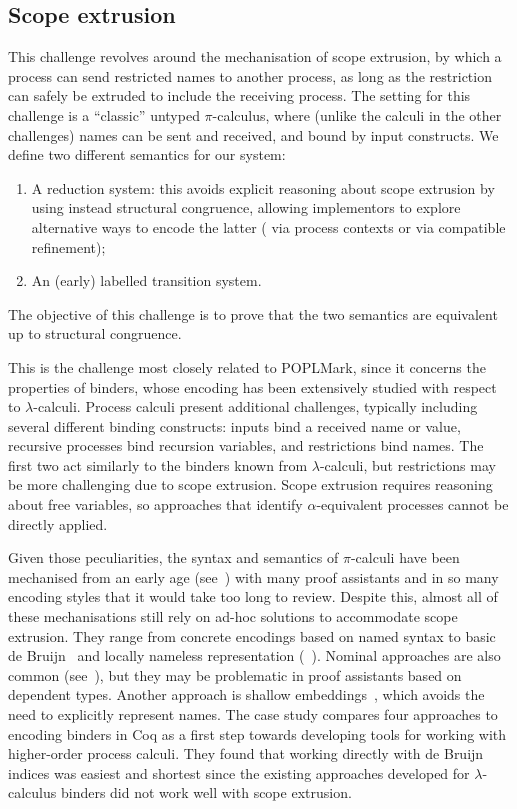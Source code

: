 \documentclass[runningheads]{llncs}
\begin{document}
\subsection{Scope extrusion}
This challenge revolves around the mechanisation of scope
extrusion, by which a process can send restricted names to another
process, as long as the restriction can safely be extruded to include
the receiving process.  The setting for this challenge is a
``classic'' untyped \( \pi \)-calculus, where (unlike the calculi in
the other challenges) names can be sent and received, and bound by
input constructs.  We define two different semantics for our system:
\begin{enumerate}
\item A reduction system: this avoids explicit reasoning about scope
  extrusion by using instead structural congruence, allowing
  implementors to explore alternative ways to encode the latter (\eg
  via process contexts or via compatible refinement);
\item An (early) labelled transition system.
\end{enumerate}
The objective of this
challenge is to prove that the two semantics are equivalent up to
structural congruence.

This is the challenge most closely related to POPLMark,
since it concerns the properties of binders, whose encoding has been
extensively studied with respect to $\lambda$-calculi. Process calculi
present additional challenges, typically including several
different binding constructs: inputs bind a received name or value,
recursive processes bind recursion variables, and restrictions bind
names. The first two act similarly to the binders known from
$\lambda$-calculi, but restrictions may be more challenging due to
scope extrusion.
Scope extrusion requires reasoning about free variables, so approaches that identify \(\alpha\)-equivalent processes cannot be directly applied.

Given those peculiarities, the syntax and semantics of $\pi$-calculi have been
mechanised from an early age (see~\cite{Melham1994}) with many proof
assistants and in so many encoding styles that it would take too long to
review.
Despite this, almost all of these mechanisations still rely on ad-hoc solutions to accommodate scope extrusion.
They range from concrete encodings based on named syntax
\cite{Melham1994} to basic de Bruijn~\cite{Hirschkoff1997, Perera2018} and locally nameless
representation %
(\eg~\cite{Castro2020}).
Nominal approaches are also common (see~\cite{Bengtson2009}), but they
may be problematic in proof assistants based on dependent types.
Another approach is shallow embeddings~\cite{Castro-Perez2021}, which avoids the need to explicitly represent names.
The case study \cite{AmbalLS21} compares four approaches to encoding
binders in Coq as a first step towards developing tools for working
with higher-order process calculi.  They found that working directly
with de Bruijn indices was easiest and shortest since the existing
approaches developed for $\lambda$-calculus binders did not work well
with scope extrusion.
\end{document}
